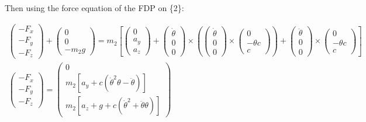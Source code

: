 \documentclass[\main/main.tex]{subfiles}
\begin{document}
%

Then using the force equation of the FDP on \{2\}:

\begin{gather*}
  \begin{pmatrix}
  - F_x \\
  - F_y \\
  - F_z
  \end{pmatrix}
  +
  \begin{pmatrix}
  0 \\
  0 \\
  -m_2 g
  \end{pmatrix}
  = m_2
  \left[
  \begin{pmatrix}
  0 \\
  a_y \\
  a_z
  \end{pmatrix}
  +
  \begin{pmatrix}
  \dot{\theta} \\
  0 \\
  0
  \end{pmatrix}
  \times
  \left(
  \begin{pmatrix}
  \dot{\theta} \\
  0 \\
  0
  \end{pmatrix}
  \times
  \begin{pmatrix}
  0 \\
  -\theta c \\
  c
  \end{pmatrix}
  \right)
  +
  \begin{pmatrix}
  \ddot{\theta} \\
  0 \\
  0
  \end{pmatrix}
  \times
  \begin{pmatrix}
  0 \\
  -\theta c \\
  c
  \end{pmatrix}
  \right] \\
  \begin{pmatrix}
  - F_x \\
  - F_y \\
  - F_z
  \end{pmatrix}
  =
  \begin{pmatrix}
  0 \\
  m_2 [a_y + c (\dot{\theta}^2 \theta - \ddot{\theta})] \\
  m_2 [a_z + g + c (\dot{\theta}^2 + \ddot{\theta} \theta)]
  \end{pmatrix}
\end{gather*}
\end{document}
